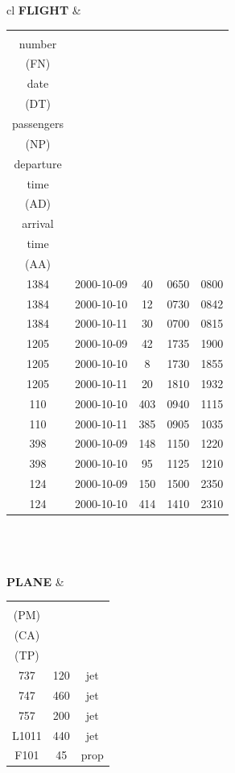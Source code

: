 \documentclass[12pt]{article}
\begin{document}
\begin{enumerate}
\begin{center}
\begin{tabular}{cl}
\textbf{FLIGHT} & 
\begin{tabular}{ccccc}
\shortstack{flight \\ number \\ (FN)} & 
\shortstack{ \\ date \\ (DT)} & 
\shortstack{number of \\ passengers \\ (NP)} & 
\shortstack{actual \\ departure \\ time \\ (AD)} & 
\shortstack{actual \\ arrival \\ time \\ (AA)} \\
\hline
1384 & 2000-10-09 & 40 & 0650 & 0800 \\
1384 & 2000-10-10 & 12 & 0730 & 0842 \\
1384 & 2000-10-11 & 30 & 0700 & 0815 \\
1205 & 2000-10-09 & 42 & 1735 & 1900 \\
1205 & 2000-10-10 &  8 & 1730 & 1855 \\
1205 & 2000-10-11 & 20 & 1810 & 1932 \\
 110 & 2000-10-10 & 403 & 0940 & 1115 \\
 110 & 2000-10-11 & 385 & 0905 & 1035 \\
 398 & 2000-10-09 & 148 & 1150 & 1220 \\
 398 & 2000-10-10 & 95 & 1125 & 1210 \\
 124 & 2000-10-09 & 150 & 1500 & 2350 \\
 124 & 2000-10-10 & 414 & 1410 & 2310 \\
\end{tabular} \\
 \\ %
 \\

\textbf{PLANE} & 
\begin{tabular}{ccc}
\shortstack{model \\ (PM)} & 
\shortstack{capacity \\ (CA)} & 
\shortstack{type \\ (TP)} \\
\hline
737 & 120 & jet \\
747 & 460 & jet \\
757 & 200 & jet \\
L1011 & 440 & jet \\
F101 & 45 & prop \\
\end{tabular} \\


\end{tabular}
\end{center}
\end{enumerate}
\end{document}

